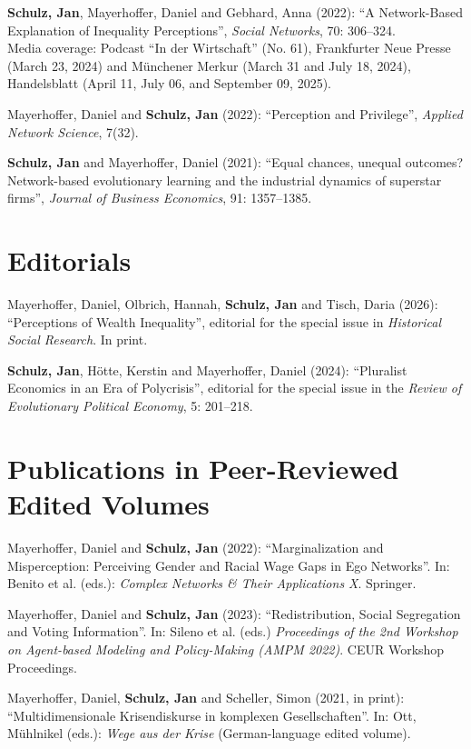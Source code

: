 \documentclass[margin]{res}
\begin{document}
\begin{resume}
	
	\textbf{Schulz, Jan}, Mayerhoffer, Daniel and Gebhard, Anna (2022): ``A Network-Based Explanation of Inequality Perceptions'', \textit{Social Networks}, 70: 306--324.\\
	Media coverage: Podcast ``In der Wirtschaft'' (No. 61), Frankfurter Neue Presse (March 23, 2024) and M\"unchener Merkur (March 31 and July 18, 2024), Handelsblatt (April 11, July 06, and September 09, 2025).
	
	Mayerhoffer, Daniel and \textbf{Schulz, Jan} (2022): ``Perception and Privilege'', \textit{Applied Network Science}, 7(32).
	
	\textbf{Schulz, Jan} and Mayerhoffer, Daniel (2021): ``Equal chances, unequal outcomes? Network-based evolutionary learning and the industrial dynamics of superstar firms'', \textit{Journal of Business Economics}, 91: 1357--1385.
	
	\section{Editorials}
	Mayerhoffer, Daniel, Olbrich, Hannah, \textbf{Schulz, Jan} and Tisch, Daria (2026): ``Perceptions of Wealth Inequality'', editorial for the special issue in \textit{Historical Social Research}. In print.
	
	\textbf{Schulz, Jan}, H\"otte, Kerstin and Mayerhoffer, Daniel (2024): ``Pluralist Economics in an Era of Polycrisis'', editorial for the special issue in the \emph{Review of Evolutionary Political Economy}, 5: 201--218.
	
	\section{Publications in Peer-Reviewed Edited Volumes} Mayerhoffer, Daniel and \textbf{Schulz, Jan} (2022): ``Marginalization and Misperception: Perceiving Gender and Racial Wage Gaps in Ego Networks''. In: Benito et al. (eds.): \textit{Complex Networks \& Their Applications X}. Springer.
	
	Mayerhoffer, Daniel and \textbf{Schulz, Jan} (2023): ``Redistribution, Social Segregation and Voting Information''. In: Sileno et al. (eds.) \textit{Proceedings of the 2nd Workshop on Agent-based Modeling and Policy-Making (AMPM 2022)}.  CEUR Workshop Proceedings.
	
	
	Mayerhoffer, Daniel, \textbf{Schulz, Jan} and Scheller, Simon (2021, in print): ``Multidimensionale Krisendiskurse in komplexen Gesellschaften''. In: Ott, M\"uhlnikel (eds.): \textit{Wege aus der Krise} (German-language edited volume).\\
	

\end{resume}
\end{document}
